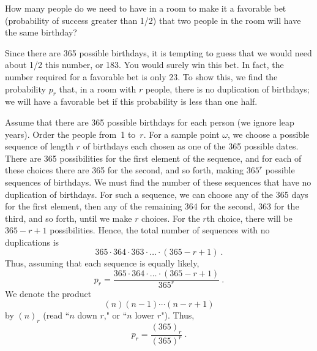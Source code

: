 \begin{example}\label{exam 3.3} How many people do we need to have in a room to make
it a favorable bet (probability of success greater than 1/2) that two people in the
room will have the same birthday?

Since there are 365 possible birthdays, it is tempting to guess that we would need
about 1/2 this number, or 183.  You would surely win this bet.  In fact, the number
required for a favorable bet is only 23.  To show this, we find the probability $p_r$
that, in a room with $r$ people, there is no duplication of birthdays; we will have a
favorable bet if this probability is less than one half.

Assume that there are 365 possible birthdays for each person (we ignore leap years). 
Order the people from~1 to~$r$.  For a sample point $\omega$, we choose a possible
sequence of length $r$ of birthdays each chosen as one of the 365 possible dates. 
There are 365 possibilities for the first element of the sequence, and for each of
these choices there are 365 for the second, and so forth, making $365^r$ possible
sequences of birthdays.  We must find the number of these sequences that have no
duplication of birthdays.  For such a sequence, we can choose any of the 365 days for
the first element, then any of the remaining 364 for the second, 363 for the third,
and so forth, until we make
$r$ choices.  For the $r$th choice, there will be $365 - r + 1$ possibilities. 
Hence, the total number of sequences with no duplications is
$$ 365 \cdot 364 \cdot 363 \cdot \dots \cdot (365 - r + 1)\ .
$$ Thus, assuming that each sequence is equally likely,
$$ p_r = \frac{365 \cdot 364 \cdot \dots \cdot (365 - r + 1)}{365^r}\ .
$$ We denote the product
$$(n)(n-1)\cdots (n - r +1)$$ by $(n)_r$ (read ``$n$ down $r$," or ``$n$ lower $r$").  Thus,
$$ p_r = \frac{(365)_r}{(365)^r}\ .
$$


\end{example}
